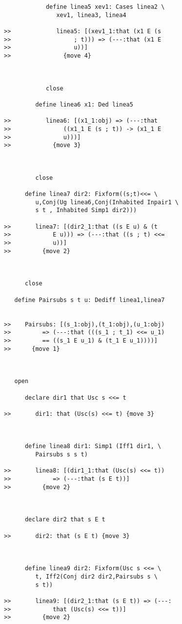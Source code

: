 \documentclass[12pt]{article}
\begin{document}
\begin{verbatim}
            define linea5 xev1: Cases linea2 \
               xev1, linea3, linea4

>>             linea5: [(xev1_1:that (x1 E (s
>>                  ; t))) => (---:that (x1 E
>>                  u))]
>>               {move 4}



            close

         define linea6 x1: Ded linea5

>>          linea6: [(x1_1:obj) => (---:that
>>               ((x1_1 E (s ; t)) -> (x1_1 E
>>               u)))]
>>            {move 3}



         close

      define linea7 dir2: Fixform((s;t)<<= \
         u,Conj(Ug linea6,Conj(Inhabited Inpair1 \
         s t , Inhabited Simp1 dir2)))

>>       linea7: [(dir2_1:that ((s E u) & (t
>>            E u))) => (---:that ((s ; t) <<=
>>            u))]
>>         {move 2}



      close

   define Pairsubs s t u: Dediff linea1,linea7


>>    Pairsubs: [(s_1:obj),(t_1:obj),(u_1:obj)
>>         => (---:that (((s_1 ; t_1) <<= u_1)
>>         == ((s_1 E u_1) & (t_1 E u_1))))]
>>      {move 1}



   open

      declare dir1 that Usc s <<= t

>>       dir1: that (Usc(s) <<= t) {move 3}



      define linea8 dir1: Simp1 (Iff1 dir1, \
         Pairsubs s s t)

>>       linea8: [(dir1_1:that (Usc(s) <<= t))
>>            => (---:that (s E t))]
>>         {move 2}



      declare dir2 that s E t

>>       dir2: that (s E t) {move 3}



      define linea9 dir2: Fixform(Usc s <<= \
         t, Iff2(Conj dir2 dir2,Pairsubs s \
         s t))

>>       linea9: [(dir2_1:that (s E t)) => (---:
>>            that (Usc(s) <<= t))]
>>         {move 2}




\end{verbatim}
\end{document}
